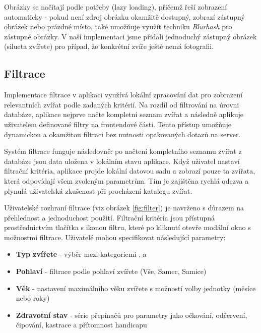 \documentclass[czech, bp, kiv, he, iso690numb, pdf]{fasthesis}
\begin{document}
    Obrázky se načítají podle potřeby (lazy loading), přičemž  řeší zobrazení automaticky - pokud není zdroj obrázku okamžitě dostupný, zobrazí zástupný obrázek nebo prázdné místo.  také umožňuje využít techniku \textit{Blurhash} pro zástupné obrázky. V naší implementaci jsme přidali jednoduchý zástupný obrázek (silueta zvířete) pro případ, že konkrétní zvíře ještě nemá fotografii.

    \subsection{Filtrace}

    Implementace filtrace v aplikaci využívá lokální zpracování dat pro zobrazení relevantních zvířat podle zadaných kritérií. Na rozdíl od filtrování na úrovni databáze, aplikace nejprve načte kompletní seznam zvířat a následně aplikuje uživatelem definované filtry na frontendové části. Tento přístup umožňuje dynamickou a okamžitou filtraci bez nutnosti opakovaných dotazů na server.

    Systém filtrace funguje následovně: po načtení kompletního seznamu zvířat z  databáze jsou data uložena v lokálním stavu aplikace. Když uživatel nastaví filtrační kritéria, aplikace projde lokální datovou sadu a zobrazí pouze ta zvířata, která odpovídají všem zvoleným parametrům. Tím je zajištěna rychlá odezva a plynulá uživatelská zkušenost při procházení katalogu zvířat.

    Uživatelské rozhraní filtrace (viz obrázek \ref{fig:filter}) je navrženo s důrazem na přehlednost a jednoduchost použití. Filtrační kritéria jsou přístupná prostřednictvím tlačítka s ikonou filtru, které po kliknutí otevře modální okno s možnostmi filtrace. Uživatelé mohou specifikovat následující parametry:

    \begin{itemize}
        \item \textbf{Typ zvířete} - výběr mezi kategoriemi ,  a 
        \item \textbf{Pohlaví} - filtrace podle pohlaví zvířete (Vše, Samec, Samice)
        \item \textbf{Věk} - nastavení maximálního věku zvířete s možností volby jednotky (měsíce nebo roky)
        \item \textbf{Zdravotní stav} - série přepínačů pro parametry jako očkování, odčervení, čipování, kastrace a přítomnost handicapu
    \end{itemize}
\end{document}
